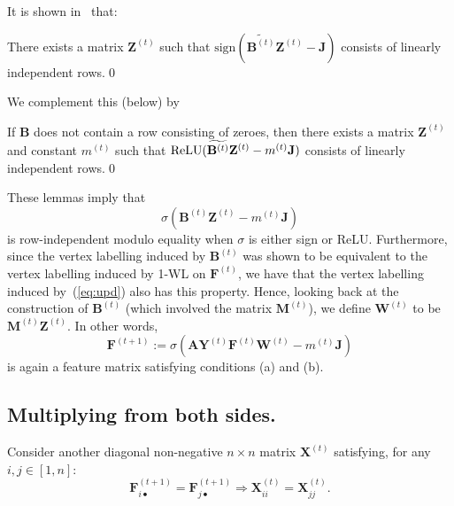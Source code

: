 It is shown in~\cite{grohewl} that:
\begin{lemma}
There exists a matrix $\mathbf{Z}^{(t)}$ such that $\text{sign}(\widetilde{\mathbf{B}^{(t)}}\mathbf{Z}^{(t)}-\mathbf{J})$ consists of linearly independent rows.\qed
\end{lemma}
We complement this (below) by 
\begin{lemma}
If $\mathbf{B}$ does not contain a row consisting of zeroes, then
there exists a matrix $\mathbf{Z}^{(t)}$ and constant $m^{(t)}$ such that $\text{\normalfont ReLU}(\widetilde{\mathbf{B}^{(t)}}\mathbf{Z}^{(t)}-m^{(t)}\mathbf{J})$ consists of linearly independent rows.\qed
\end{lemma}
These lemmas imply that 
\begin{equation}
\sigma(\mathbf{B}^{(t)}\mathbf{Z}^{(t)}- m^{(t)}\mathbf{J}) \label{eq:upd}
\end{equation}
is row-independent modulo equality when $\sigma$ is either sign or ReLU. Furthermore, since the vertex labelling induced by $\mathbf{B}^{(t)}$ was shown to be equivalent to the vertex labelling induced by 1-WL on $\mathbf{F}^{(t)}$, we have that the vertex labelling induced by~(\ref{eq:upd}) also has this property. Hence, looking back at the construction of $\mathbf{B}^{(t)}$ (which involved the matrix $\mathbf{M}^{(t)}$), we define $\mathbf{W}^{(t)}$ to be 
$\mathbf{M}^{(t)}\mathbf{Z}^{(t)}$. In other words,
\begin{equation}
\mathbf{F}^{(t+1)}:=\sigma(\mathbf{A}\mathbf{Y}^{(t)}\mathbf{F}^{(t)}\mathbf{W}^{(t)} - m^{(t)}\mathbf{J}) \label{eq:finalupd}
\end{equation}
is again a feature matrix satisfying conditions (a) and (b).
 
\subsection{Multiplying from both sides.}\label{subsec:right}
\begin{definition}\label{def:rightmult}
Consider another diagonal non-negative $n\times n$ matrix $\mathbf{X}^{(t)}$  satisfying,
for any $i,j\in[1,n]$:
\begin{equation}
\mathbf{F}_{i\bullet}^{(t+1)}=\mathbf{F}_{j\bullet}^{(t+1)} \Longrightarrow \mathbf{X}^{(t)}_{ii}=\mathbf{X}^{(t)}_{jj}. \label{eq:cond2}
\end{equation}
\end{definition}

